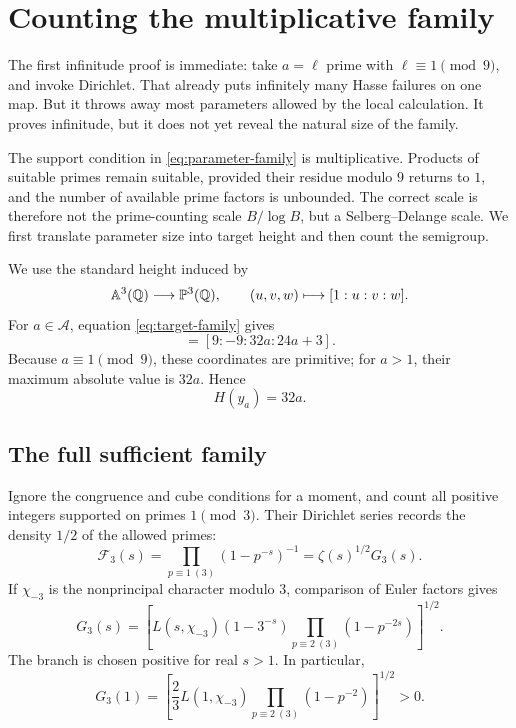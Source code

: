\section{Counting the multiplicative family}\label{sec:counting}

The first infinitude proof is immediate: take \(a=\ell\) prime with
\(\ell\equiv1\pmod9\), and invoke Dirichlet.  That already puts infinitely
many Hasse failures on one map.  But it throws away most parameters allowed
by the local calculation.  It proves infinitude, but it does not yet reveal
the natural size of the family.

The support condition in \eqref{eq:parameter-family} is multiplicative.
Products of suitable primes remain suitable, provided their residue modulo
\(9\) returns to \(1\), and the number of available prime factors is
unbounded.  The correct scale is therefore not the prime-counting scale
\(B/\log B\), but a Selberg--Delange scale.  We first translate parameter
size into target height and then count the semigroup.

We use the standard height induced by
\begin{equation}
 \mathbb A^3(\mathbb Q)\longrightarrow\mathbb P^3(\mathbb Q),\qquad
 (u,v,w)\longmapsto[1:u:v:w].
\end{equation}
For \(a\in\mathcal A\), equation \eqref{eq:target-family} gives
\begin{equation}
 [1:y_a]=[9:-9:32a:24a+3].
\end{equation}
Because \(a\equiv1\pmod9\), these coordinates are primitive; for \(a>1\),
their maximum absolute value is \(32a\).  Hence
\begin{equation}
 H(y_a)=32a.\label{eq:height}
\end{equation}

\subsection{The full sufficient family}

Ignore the congruence and cube conditions for a moment, and count all
positive integers supported on primes \(1\pmod3\).  Their Dirichlet series
records the density \(1/2\) of the allowed primes:
\begin{equation}
 \mathcal F_3(s)
 =\prod_{p\equiv1\ (3)}(1-p^{-s})^{-1}
 =\zeta(s)^{1/2}G_3(s).\label{eq:f3}
\end{equation}
If \(\chi_{-3}\) is the nonprincipal character modulo \(3\), comparison of
Euler factors gives
\begin{equation}
 G_3(s)=
 \left[
 L(s,\chi_{-3})(1-3^{-s})
 \prod_{p\equiv2\ (3)}(1-p^{-2s})
 \right]^{1/2}.
\end{equation}
The branch is chosen positive for real \(s>1\).  In particular,
\begin{equation}
 G_3(1)=
 \left[
 \frac23L(1,\chi_{-3})
 \prod_{p\equiv2\ (3)}(1-p^{-2})
 \right]^{1/2}>0.
\end{equation}

